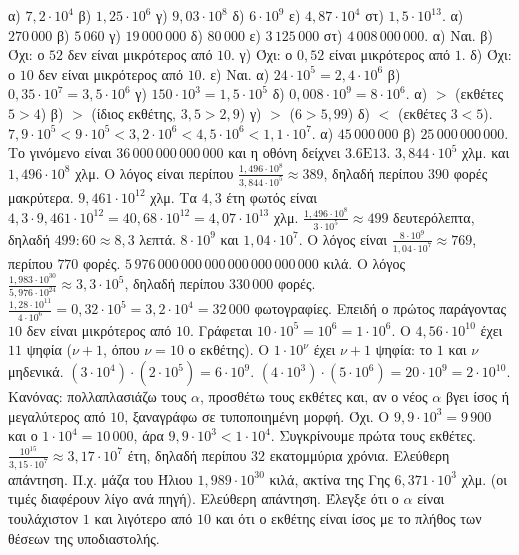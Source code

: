  α) $7{,}2\cdot10^4$ \quad β) $1{,}25\cdot10^6$ \quad γ) $9{,}03\cdot10^8$ \quad δ) $6\cdot10^9$ \quad ε) $4{,}87\cdot10^4$ \quad στ) $1{,}5\cdot10^{13}$.
 α) $270\,000$ \quad β) $5\,060$ \quad γ) $19\,000\,000$ \quad δ) $80\,000$ \quad ε) $3\,125\,000$ \quad στ) $4\,008\,000\,000$.
 α) Ναι. β) Όχι: ο $52$ δεν είναι μικρότερος από $10$. γ) Όχι: ο $0{,}52$ είναι μικρότερος από $1$. δ) Όχι: ο $10$ δεν είναι μικρότερος από $10$. ε) Ναι.
 α) $24\cdot10^5=2{,}4\cdot10^6$ \quad β) $0{,}35\cdot10^7=3{,}5\cdot10^6$ \quad γ) $150\cdot10^3=1{,}5\cdot10^5$ \quad δ) $0{,}008\cdot10^9=8\cdot10^6$.
 α) $>$ (εκθέτες $5>4$) \quad β) $>$ (ίδιος εκθέτης, $3{,}5>2{,}9$) \quad γ) $>$ ($6>5{,}99$) \quad δ) $<$ (εκθέτες $3<5$).
 $7{,}9\cdot10^5<9\cdot10^5<3{,}2\cdot10^6<4{,}5\cdot10^6<1{,}1\cdot10^7$.
 α) $45\,000\,000$ \quad β) $25\,000\,000\,000$. Το γινόμενο είναι $36\,000\,000\,000\,000$ και η οθόνη δείχνει $3.6\mathrm{E}13$.
 $3{,}844\cdot10^5$ χλμ. και $1{,}496\cdot10^8$ χλμ. Ο λόγος είναι περίπου $\frac{1{,}496\cdot10^8}{3{,}844\cdot10^5}\approx389$, δηλαδή περίπου $390$ φορές μακρύτερα.
 $9{,}461\cdot10^{12}$ χλμ. Τα $4{,}3$ έτη φωτός είναι $4{,}3\cdot9{,}461\cdot10^{12}=40{,}68\cdot10^{12}=4{,}07\cdot10^{13}$ χλμ.
 $\frac{1{,}496\cdot10^8}{3\cdot10^5}\approx499$ δευτερόλεπτα, δηλαδή $499:60\approx8{,}3$ λεπτά.
 $8\cdot10^9$ και $1{,}04\cdot10^7$. Ο λόγος είναι $\frac{8\cdot10^9}{1{,}04\cdot10^7}\approx769$, περίπου $770$ φορές.
 $5\,976\,000\,000\,000\,000\,000\,000\,000$ κιλά. Ο λόγος $\frac{1{,}983\cdot10^{30}}{5{,}976\cdot10^{24}}\approx3{,}3\cdot10^5$, δηλαδή περίπου $330\,000$ φορές.
 $\frac{1{,}28\cdot10^{11}}{4\cdot10^6}=0{,}32\cdot10^5=3{,}2\cdot10^4=32\,000$ φωτογραφίες.
 Επειδή ο πρώτος παράγοντας $10$ δεν είναι μικρότερος από $10$. Γράφεται $10\cdot10^5=10^6=1\cdot10^6$.
 Ο $4{,}56\cdot10^{10}$ έχει $11$ ψηφία ($\nu+1$, όπου $\nu=10$ ο εκθέτης). Ο $1\cdot10^{\nu}$ έχει $\nu+1$ ψηφία: το $1$ και $\nu$ μηδενικά.
 $(3\cdot10^4)\cdot(2\cdot10^5)=6\cdot10^9$. $(4\cdot10^3)\cdot(5\cdot10^6)=20\cdot10^9=2\cdot10^{10}$. Κανόνας: πολλαπλασιάζω τους $\alpha$, προσθέτω τους εκθέτες και, αν ο νέος $\alpha$ βγει ίσος ή μεγαλύτερος από $10$, ξαναγράφω σε τυποποιημένη μορφή.
 Όχι. Ο $9{,}9\cdot10^3=9\,900$ και ο $1\cdot10^4=10\,000$, άρα $9{,}9\cdot10^3<1\cdot10^4$. Συγκρίνουμε πρώτα τους εκθέτες.
 $\frac{10^{15}}{3{,}15\cdot10^7}\approx3{,}17\cdot10^7$ έτη, δηλαδή περίπου $32$ εκατομμύρια χρόνια.
 Ελεύθερη απάντηση. Π.χ. μάζα του Ήλιου $1{,}989\cdot10^{30}$ κιλά, ακτίνα της Γης $6{,}371\cdot10^3$ χλμ. (οι τιμές διαφέρουν λίγο ανά πηγή).
 Ελεύθερη απάντηση. Έλεγξε ότι ο $\alpha$ είναι τουλάχιστον $1$ και λιγότερο από $10$ και ότι ο εκθέτης είναι ίσος με το πλήθος των θέσεων της υποδιαστολής.
